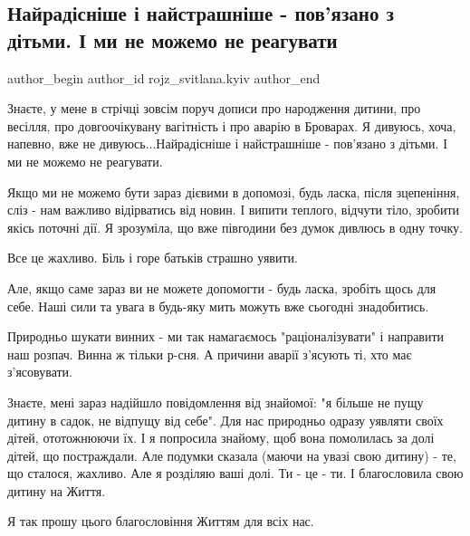  
 
 
 
 

\subsection{Найрадісніше і найстрашніше - пов'язано з дітьми. І ми не можемо не реагувати}
\label{sec:18_01_2023.fb.rojz_svitlana.kyiv.1.nairad_sn_she___nais}

\ifcmt
 author_begin
   author_id rojz_svitlana.kyiv
 author_end
\fi


Знаєте, у мене в стрічці зовсім  поруч дописи про народження дитини, про
весілля, про довгоочікувану вагітність  і про аварію в Броварах. Я дивуюсь,
хоча, напевно, вже не дивуюсь...Найрадісніше і найстрашніше - пов'язано з
дітьми. І ми не можемо не реагувати. 

Якщо ми не можемо бути зараз дієвими в допомозі, будь ласка, після зцепеніння,
сліз - нам важливо відірватись від новин. І випити теплого, відчути тіло,
зробити якісь поточні дії. Я зрозуміла, що вже півгодини без думок дивлюсь в
одну точку. 

Все це жахливо. Біль і горе батьків страшно уявити. 

Але, якщо саме зараз ви не можете допомогти - будь ласка, зробіть щось для
себе. Наші сили та увага в будь-яку мить можуть вже сьогодні знадобитись. 

Природньо шукати винних - ми так намагаємось "раціоналізувати" і направити наш
розпач.  Винна ж тільки р-сня. А причини аварії з'ясують ті, хто має
з'ясовувати. 

Знаєте, мені зараз надійшло повідомлення від знайомої: "я більше не пущу дитину
в садок, не відпущу від себе". Для нас природньо одразу уявляти своїх дітей,
ототожнюючи їх. І я попросила знайому, щоб вона помолилась за долі дітей, що
постраждали. Але подумки сказала (маючи на увазі свою дитину)  - те, що
сталося, жахливо. Але я розділяю ваші долі. Ти - це - ти. І благословила свою
дитину на Життя. 

Я так прошу цього благословіння Життям для всіх нас.
